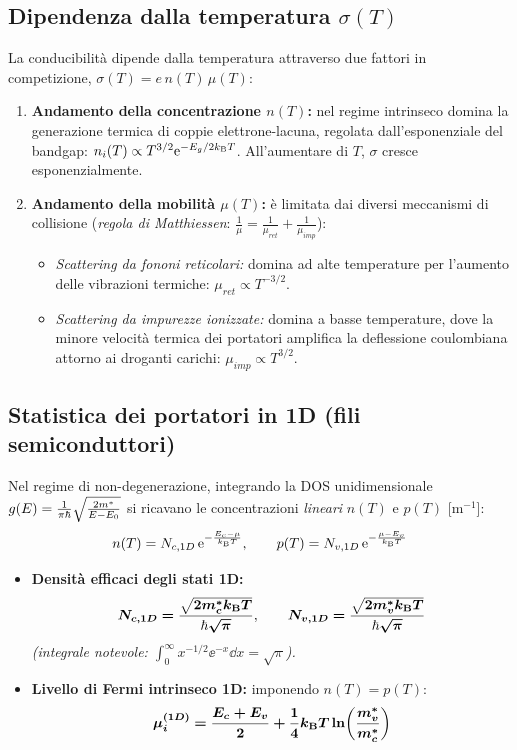 \subsection{Dipendenza dalla temperatura $\sigma(T)$}
La conducibilità dipende dalla temperatura attraverso due fattori in competizione, $\sigma(T)=e\,n(T)\,\mu(T)$:
\begin{enumerate}
\item \textbf{Andamento della concentrazione $n(T)$:} nel regime intrinseco domina la generazione termica di coppie elettrone-lacuna, regolata dall'esponenziale del bandgap: $n_i(T)\propto T^{3/2}\mathrm{e}^{-E_g/2k_{\mathrm{B}} T}$. All'aumentare di $T$, $\sigma$ cresce esponenzialmente.
\item \textbf{Andamento della mobilità $\mu(T)$:} è limitata dai diversi meccanismi di collisione (\textit{regola di Matthiessen}: $\frac{1}{\mu}=\frac{1}{\mu_{ret}}+\frac{1}{\mu_{imp}}$):
\begin{itemize}
\item \textit{Scattering da fononi reticolari:} domina ad alte temperature per l'aumento delle vibrazioni termiche: $\mu_{ret}\propto T^{-3/2}$.
\item \textit{Scattering da impurezze ionizzate:} domina a basse temperature, dove la minore velocità termica dei portatori amplifica la deflessione coulombiana attorno ai droganti carichi: $\mu_{imp}\propto T^{3/2}$.
\end{itemize}
\end{enumerate}


\subsection{Statistica dei portatori in 1D (fili semiconduttori)}
Nel regime di non-degenerazione, integrando la DOS unidimensionale $g(E)=\frac{1}{\pi\hbar}\sqrt{\frac{2m^*}{E-E_0}}$ si ricavano le concentrazioni \emph{lineari} $n(T)$ e $p(T)$ [m$^{-1}$]:
\[ n(T) = N_{c,1D}\,\mathrm{e}^{-\frac{E_c-\mu}{k_{\mathrm{B}} T}}, \qquad p(T) = N_{v,1D}\,\mathrm{e}^{-\frac{\mu-E_v}{k_{\mathrm{B}} T}} \]
\begin{itemize}
    \setlength{\itemsep}{1pt}
    \item \textbf{Densità efficaci degli stati 1D:}
    \[ \bm{N_{c,1D} = \frac{\sqrt{2m_c^*k_{\mathrm{B}} T}}{\hbar\sqrt{\pi}}}, \qquad \bm{N_{v,1D} = \frac{\sqrt{2m_v^*k_{\mathrm{B}} T}}{\hbar\sqrt{\pi}}} \]
    \textit{(integrale notevole: $\int_0^\infty x^{-1/2}\ee^{-x}\dd x=\sqrt\pi$).}
    \item \textbf{Livello di Fermi intrinseco 1D:} imponendo $n(T)=p(T)$:
    \[ \bm{\mu_i^{(1D)} = \frac{E_c+E_v}{2}+\frac14k_{\mathrm{B}} T\ln\!\left(\frac{m_v^*}{m_c^*}\right)} \]
\end{itemize}




